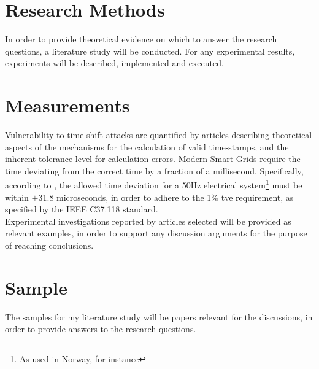 \section{Research Methods}


In order to provide theoretical evidence on which to answer the research questions, a literature study will be conducted.
For any experimental results, experiments will be described, implemented and executed.

\section{Measurements}


Vulnerability to time-shift attacks are quantified by articles describing theoretical aspects of the mechanisms for the calculation of valid time-stamps, and the inherent tolerance level for calculation errors. Modern Smart Grids require the time deviating from the correct time by a fraction of a millisecond. Specifically, according to \cite[p.  1953]{moussa2016security}, the allowed time deviation for a 50Hz electrical system\footnote{As used in Norway, for instance} must be within $\pm$31.8 microseconds, in order to adhere to the 1$\%$ \acrfull{tve} requirement, as specified by the  IEEE C37.118 standard. \\ 

Experimental investigations reported by articles selected will be provided as relevant examples, in order to support any discussion arguments for the purpose of reaching conclusions.  

\section{Sample}

The samples for my literature study will be papers relevant for the discussions, in order to provide answers to the research questions.\\ 

